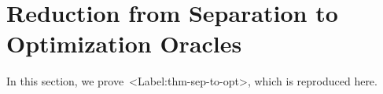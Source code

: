 \documentclass[11pt,letterpaper]{article}
\def\Cref#1{<Label:#1>}%
\newtheorem{theorem}{Theorem}[section]
\theoremstyle{definition}
\newtheorem{defn}[theorem]{Definition}
\theoremstyle{remark}
\begin{document}
\section{Reduction from Separation to Optimization Oracles}\label{section-oracles}

In this section, we prove~\Cref{thm-sep-to-opt}, which is reproduced here. 



\end{document}
